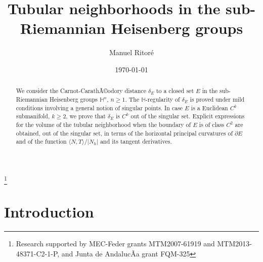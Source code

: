\documentclass[10pt]{amsart}
\theoremstyle{definition}
\theoremstyle{remark}
\numberwithin{equation}{section}
\begin{document}
\title{Tubular neighborhoods in the sub-Riemannian Heisenberg groups}

\author[M.~Ritor\'e]{Manuel Ritor\'e} \address{Departamento de
Geometr\'{\i}a y Topolog\'{\i}a \\
Universidad de Granada \\ E--18071 Granada \\ Espa\~na}

\date{\today}

\thanks{Research supported by MEC-Feder grants MTM2007-61919 and  MTM2013-48371-C2-1-P, and Junta de AndalucÃ­a grant FQM-325}

\begin{abstract}
We consider the Carnot-CarathÃ©odory distance $\delta_E$ to a closed set $E$ in the sub-Riemannian Heisenberg groups ${{\mathbb{H}}}^n$, $n{\geqslant} 1$. The ${{\mathbb{H}}}$-regularity of $\delta_E$ is proved under mild conditions involving a general notion of singular points. In case $E$ is a Euclidean $C^k$ submanifold, $k{\geqslant} 2$, we prove that $\delta_E$ is $C^k$ out of the singular set. Explicit expressions for the volume of the tubular neighborhood when the boundary of $E$ is of class $C^2$ are obtained, out of the singular set, in terms of the horizontal principal curvatures of ${\partial} E$ and of the function ${\langle{N,T}\rangle}/|N_h|$ and its tangent derivatives.
\end{abstract}

\maketitle

\thispagestyle{empty}

 

\section{Introduction}
\end{document}
